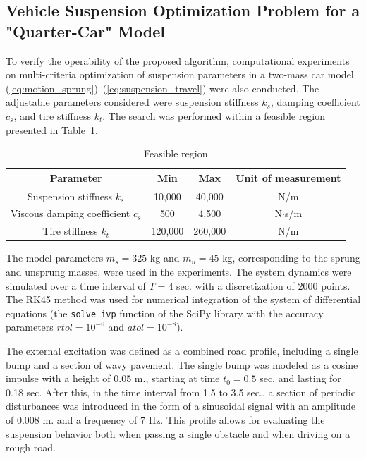 \documentclass[a4paper]{llncs}
\begin{document}
\subsection{Vehicle Suspension Optimization Problem for a "Quarter-Car" Model}
\label{subsec42}

To verify the operability of the proposed algorithm, computational experiments on multi-criteria optimization of suspension parameters in a two-mass car model (\ref{eq:motion_sprung})--(\ref{eq:suspension_travel}) were also conducted. The adjustable parameters considered were suspension stiffness $k_s$, damping coefficient $c_s$, and tire stiffness $k_t$. The search was performed within a feasible region presented in Table~\ref{tab:feasible_region}.

\begin{table}[ht]
\centering
\caption{Feasible region}
\label{tab:feasible_region}
\begin{tabular}{cccc}
\hline
\textbf{Parameter} & \textbf{Min} & \textbf{Max} & \textbf{Unit of measurement} \\
\hline
Suspension stiffness $k_s$ & 10,000 & 40,000 & N/m \\
Viscous damping coefficient $c_s$ & 500 & 4,500 & N$\cdot$s/m \\
Tire stiffness $k_t$ & 120,000 & 260,000 & N/m \\
\hline
\end{tabular}
\end{table}

The model parameters $m_s = 325$ kg and $m_u = 45$ kg, corresponding to the sprung and unsprung masses, were used in the experiments. The system dynamics were simulated over a time interval of $T = 4$ sec. with a discretization of 2000 points. The RK45 method was used for numerical integration of the system of differential equations (the \texttt{solve\_ivp} function of the SciPy library \cite{Virtanen2020SciPy} with the accuracy parameters $rtol = 10^{-6}$ and $atol = 10^{-8}$).

The external excitation was defined as a combined road profile, including a single bump and a section of wavy pavement. The single bump was modeled as a cosine impulse with a height of 0.05 m., starting at time $t_0 = 0.5$ sec. and lasting for 0.18 sec. After this, in the time interval from 1.5 to 3.5 sec., a section of periodic disturbances was introduced in the form of a sinusoidal signal with an amplitude of 0.008 m. and a frequency of 7 Hz. This profile allows for evaluating the suspension behavior both when passing a single obstacle and when driving on a rough road.
\end{document}
